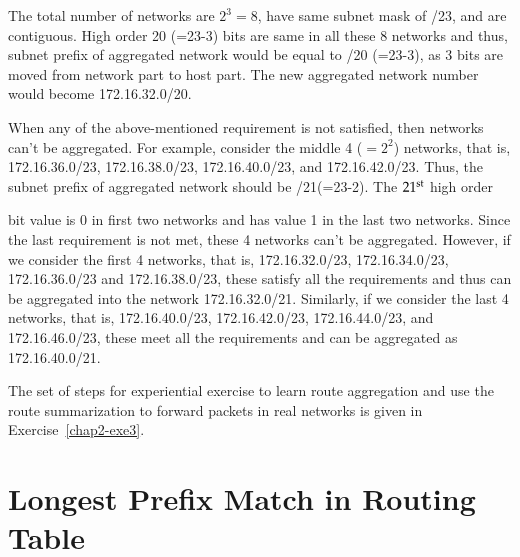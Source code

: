 \begin{multicols}{2}
The total number of networks are $2^{3}=8$, have same subnet mask of /23, and are contiguous. High order 20 (=23-3) bits are same in all these 8 networks and thus, subnet prefix of aggregated network would be equal to /20 (=23-3), as 3 bits are moved from network part to host part. The new aggregated network number would become 172.16.32.0/20.

When any of the above-mentioned requirement is not satisfied, then networks can’t be aggregated. For example, consider the middle 4 ($=2^{2}$) networks, that is, 172.16.36.0/23, 172.16.38.0/23, 172.16.40.0/23, and 172.16.42.0/23. Thus, the subnet prefix of aggregated network should be /21(=23-2). The $21^{\rm st}$ high order

bit value is 0 in first two networks and has value 1 in the last two networks. Since the last requirement is not met, these 4 networks can’t be aggregated. However, if we consider the first 4 networks, that is, 172.16.32.0/23, 172.16.34.0/23, 172.16.36.0/23 and 172.16.38.0/23, these satisfy all the requirements and thus can be aggregated into the network 172.16.32.0/21. Similarly, if we consider the last 4 networks, that is, 172.16.40.0/23, 172.16.42.0/23, 172.16.44.0/23, and 172.16.46.0/23, these meet all the requirements and can be aggregated as 172.16.40.0/21.

The set of steps for experiential exercise to learn route aggregation and use the route summarization to forward packets in real networks is given in Exercise~\ref{chap2-exe3}.

\section{Longest Prefix Match in Routing Table}\label{chap2-sec6}


\end{multicols}
